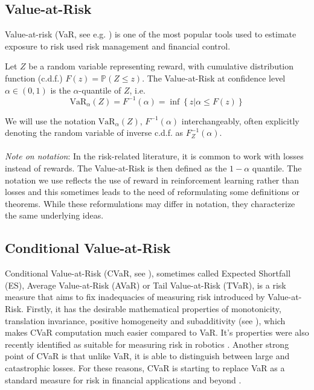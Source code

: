 \subsection{Value-at-Risk}

Value-at-risk (VaR, see e.g. \citet{wipplinger2007philippe}) is one of the most popular tools used to estimate exposure to risk used risk management and financial control.

Let $Z$ be a random variable representing reward, with cumulative distribution function (c.d.f.) $F(z) = \mathbb{P}(Z \le z)$.
The Value-at-Risk  at confidence level $\alpha \in (0,1)$ is the $\alpha$-quantile of $Z$, i.e. 
\begin{equation}
\text{VaR}_\alpha(Z)=F^{-1}(\alpha)=\inf\left\lbrace z | \alpha \le F(z) \right\rbrace
\end{equation}

We will use the notation $\text{VaR}_\alpha(Z)$, $F^{-1}(\alpha)$ interchangeably, often explicitly denoting the random variable of inverse c.d.f. as $F^{-1}_Z(\alpha)$.
\\
\\
\textit{Note on notation}: In the risk-related literature, it is common to work with losses instead of rewards. The Value-at-Risk is then defined as the $1-\alpha$ quantile. The notation we use reflects the use of reward in reinforcement learning rather than losses and this sometimes leads to the need of reformulating some definitions or theorems. While these reformulations may differ in notation, they characterize the same underlying ideas.

\subsection{Conditional Value-at-Risk}

Conditional Value-at-Risk (CVaR, see \citet{rockafellar2000optimization,rockafellar2002conditional}), sometimes called Expected Shortfall (ES), Average Value-at-Risk (AVaR) or Tail Value-at-Risk (TVaR), is a risk measure that aims to fix inadequacies of measuring risk introduced by Value-at-Risk. Firstly, it has the desirable mathematical properties of monotonicity, translation invariance, positive homogeneity and subadditivity (see \citet{artzner1999coherent}), which makes CVaR computation much easier compared to VaR. It's properties were also recently identified as suitable for measuring risk in robotics \cite{majumdar2017should}. Another strong point of CVaR is that unlike VaR, it is able to distinguish between large and catastrophic losses. For these reasons, CVaR is starting to replace VaR as a standard measure for risk in financial applications \citep{basel2013fundamental} and beyond \cite{something}.

